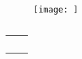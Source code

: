 \documentclass[a4paper,fleqn]{cas-sc}
\begin{document}
\section{}\label{}







\begin{figure}[<options>]
	\centering
		\texttt{[image: ]}
	  \caption{}\label{fig1}
\end{figure}


\begin{table}[<options>]
\caption{}\label{tbl1}
\begin{tabular*}{\tblwidth}{@{}LL@{}}
\toprule
  &  \\ \midrule
 & \\
 & \\
 & \\
 & \\
\bottomrule
\end{tabular*}
\end{table}







\section{}\label{}

\printcredits





\bio{}
\endbio

\endbio
\end{document}
